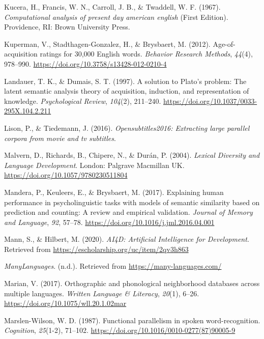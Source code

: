\documentclass[
  english,
  man,floatsintext]{apa6}
\newlength{\cslhangindent}
\newenvironment{CSLReferences}[2] %
 {\begin{list}{}{%
  \setlength{\itemindent}{0pt}
  \setlength{\leftmargin}{0pt}
  \setlength{\parsep}{0pt}
  \ifodd #1
   \setlength{\leftmargin}{\cslhangindent}
   \setlength{\itemindent}{-1\cslhangindent}
  \fi
  \setlength{\itemsep}{#2\baselineskip}}}
 {\end{list}}
\begin{document}
\begin{CSLReferences}{1}{0}
Kucera, H., Francis, W. N., Carroll, J. B., \& Twaddell, W. F. (1967). \emph{Computational analysis of present day american english} (First Edition). Providence, RI: Brown University Press.

Kuperman, V., Stadthagen-Gonzalez, H., \& Brysbaert, M. (2012). Age-of-acquisition ratings for 30,000 English words. \emph{Behavior Research Methods}, \emph{44}(4), 978--990. \url{https://doi.org/10.3758/s13428-012-0210-4}

Landauer, T. K., \& Dumais, S. T. (1997). A solution to Plato's problem: The latent semantic analysis theory of acquisition, induction, and representation of knowledge. \emph{Psychological Review}, \emph{104}(2), 211--240. \url{https://doi.org/10.1037/0033-295X.104.2.211}

Lison, P., \& Tiedemann, J. (2016). \emph{Opensubtitles2016: Extracting large parallel corpora from movie and tv subtitles}.

Malvern, D., Richards, B., Chipere, N., \& Durán, P. (2004). \emph{Lexical Diversity and Language Development}. London: Palgrave Macmillan UK. \url{https://doi.org/10.1057/9780230511804}

Mandera, P., Keuleers, E., \& Brysbaert, M. (2017). Explaining human performance in psycholinguistic tasks with models of semantic similarity based on prediction and counting: A review and empirical validation. \emph{Journal of Memory and Language}, \emph{92}, 57--78. \url{https://doi.org/10.1016/j.jml.2016.04.001}

Mann, S., \& Hilbert, M. (2020). \emph{AI4D: Artificial Intelligence for Development}. Retrieved from \url{https://escholarship.org/uc/item/2qv3h863}

\emph{ManyLanguages}. (n.d.). Retrieved from \url{https://many-languages.com/}

Marian, V. (2017). Orthographic and phonological neighborhood databases across multiple languages. \emph{Written Language \& Literacy}, \emph{20}(1), 6--26. \url{https://doi.org/10.1075/wll.20.1.02mar}

Marslen-Wilson, W. D. (1987). Functional parallelism in spoken word-recognition. \emph{Cognition}, \emph{25}(1-2), 71--102. \url{https://doi.org/10.1016/0010-0277(87)90005-9}


\end{CSLReferences}
\end{document}
